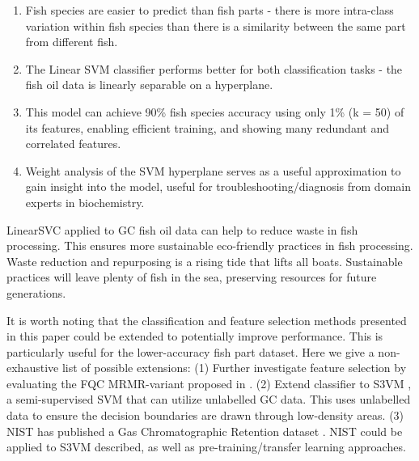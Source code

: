 \documentclass[runningheads]{llncs}
\begin{document}
\begin{enumerate}
  \item Fish species are easier to predict than fish parts - there is more intra-class variation within fish species than there is a similarity between the same part from different fish.
  \item The Linear SVM classifier performs better for both classification tasks - the fish oil data is linearly separable on a hyperplane.
  \item This model can achieve 90\% fish species accuracy using only 1\% (k = 50) of its features, enabling efficient training, and showing many redundant and correlated features. 
  \item Weight analysis of the SVM hyperplane serves as a useful approximation to gain insight into the model, useful for troubleshooting/diagnosis from domain experts in biochemistry. 
\end{enumerate}

LinearSVC applied to GC fish oil data can help to reduce waste in fish processing. 
This ensures more sustainable eco-friendly practices in fish processing.
Waste reduction and repurposing is a rising tide that lifts all boats.
Sustainable practices will leave plenty of fish in the sea, preserving resources for future generations. 


It is worth noting that the classification and feature selection methods presented in this paper could be extended to potentially improve performance. 
This is particularly useful for the lower-accuracy fish part dataset. 
Here we give a non-exhaustive list of possible extensions: 
(1) Further investigate feature selection by evaluating the FQC MRMR-variant proposed in \cite{zhao2019maximum}. 
(2) Extend classifier to S3VM \cite{zemmal2016adaptative}, a semi-supervised SVM that can utilize unlabelled GC data. 
This uses unlabelled data to ensure the decision boundaries are drawn through low-density areas.
(3) NIST has published a Gas Chromatographic Retention dataset \cite{kovats1958gas}. 
NIST could be applied to S3VM described, as well as pre-training/transfer learning approaches. 
\end{document}

